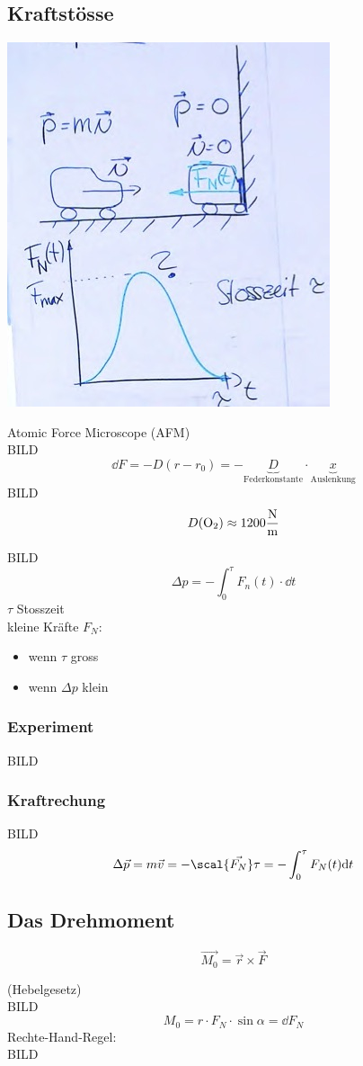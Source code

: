\subsection{Kraftstösse}
\includegraphics{Bild30}
\begin{rep*}
	Atomic Force Microscope (AFM) \\
	BILD
	\[ \dd F =  -D ( r - r_0 ) = -\underbrace{D}_{\text{Federkonstante}} \cdot \underbrace{x}_{\text{Auslenkung}} \]
	BILD
	\[ D( \ce{O2} ) \approx 1200 \frac{\text{N}}{\text{m}} \]
\end{rep*}
BILD
\[ \Delta p = -\int_0^\tau F_n(t) \cdot \dd t \]
$\tau$ Stosszeit \\
kleine Kräfte $F_N$:
\begin{itemize}
	\item wenn $\tau$ gross
	\item wenn $\Delta p$ klein
\end{itemize}

\subsubsection{Experiment}
BILD

\subsubsection{Kraftrechung}
BILD
\[ \Delta \vec{p} = m \vec{v} = - \scal{\vec{F_N}} \tau = - \int_0^\tau F_N(t) \dd t \]

\subsection{Das Drehmoment}
\begin{def*}[ note = Drehmoment , index = Drehmoment ]
	\[ \vec{M_0} = \vec{r} \times \vec{F} \]
\end{def*}
(Hebelgesetz) \\
BILD
\[ M_0 = r \cdot F_N \cdot \sin \alpha = \dd F_N \]
Rechte-Hand-Regel: \\
BILD \\

